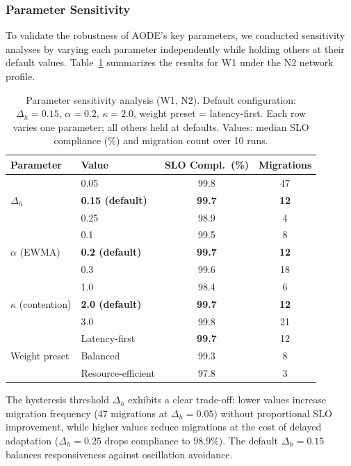 \documentclass[preprint,review,12pt]{elsarticle}
\begin{document}
\subsubsection{Parameter Sensitivity}

To validate the robustness of AODE's key parameters, we conducted sensitivity analyses by varying each parameter independently while holding others at their default values. Table~\ref{tab:sensitivity} summarizes the results for W1 under the N2 network profile.

\begin{table}[htbp]
\centering
\caption{Parameter sensitivity analysis (W1, N2). Default configuration: $\Delta_h = 0.15$, $\alpha = 0.2$, $\kappa = 2.0$, weight preset = latency-first. Each row varies one parameter; all others held at defaults. Values: median SLO compliance (\%) and migration count over 10 runs.}
\label{tab:sensitivity}
\begin{tabular}{@{}llcc@{}}
\toprule
Parameter & Value & SLO Compl.\ (\%) & Migrations \\
\midrule
\multirow{3}{*}{$\Delta_h$} & 0.05 & 99.8 & 47 \\
 & \textbf{0.15 (default)} & \textbf{99.7} & \textbf{12} \\
 & 0.25 & 98.9 & 4 \\
\midrule
\multirow{3}{*}{$\alpha$ (EWMA)} & 0.1 & 99.5 & 8 \\
 & \textbf{0.2 (default)} & \textbf{99.7} & \textbf{12} \\
 & 0.3 & 99.6 & 18 \\
\midrule
\multirow{3}{*}{$\kappa$ (contention)} & 1.0 & 98.4 & 6 \\
 & \textbf{2.0 (default)} & \textbf{99.7} & \textbf{12} \\
 & 3.0 & 99.8 & 21 \\
\midrule
\multirow{3}{*}{Weight preset} & Latency-first & \textbf{99.7} & 12 \\
 & Balanced & 99.3 & 8 \\
 & Resource-efficient & 97.8 & 3 \\
\bottomrule
\end{tabular}
\end{table}

The hysteresis threshold $\Delta_h$ exhibits a clear trade-off: lower values increase migration frequency (47 migrations at $\Delta_h = 0.05$) without proportional SLO improvement, while higher values reduce migrations at the cost of delayed adaptation ($\Delta_h = 0.25$ drops compliance to 98.9\%). The default $\Delta_h = 0.15$ balances responsiveness against oscillation avoidance.
\end{document}
